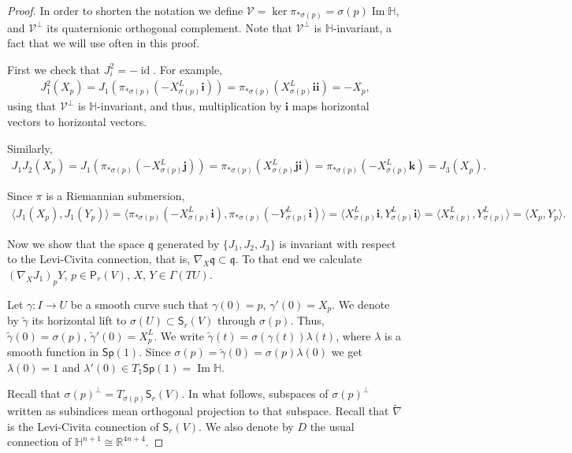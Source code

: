 \documentclass[12pt, a4paper,draft]{amsart}
\newcommand{\id}{\operatorname{id}}
\newcommand{\g}{\mathfrak}
\newcommand{\R}{\mathbb{R}}
\renewcommand{\H}{\mathbb{H}}
\renewcommand{\Im}{\operatorname{Im}}
\newcommand{\Sp}{\mathsf{Sp}}
\theoremstyle{remark}
\begin{document}
\begin{proof}
In order to shorten the notation we define $\mathcal{V}=\ker\pi_{*\sigma(p)}=\sigma(p)\Im\H$, and $\mathcal{V}^\perp$ its quaternionic orthogonal complement.
Note that ${\mathcal{V}}^\perp$ is $\H$-invariant, a fact that we will use often in this proof.

First we check that $J_i^2=-\id$.
For example, 
\[
\begin{aligned}
J_1^2(X_p)
=J_1(\pi_{*\sigma(p)}(-X_{\sigma(p)}^L\mathbf{i}))
=\pi_{*\sigma(p)}(X_{\sigma(p)}^L\mathbf{i}\mathbf{i})
=-X_p,
\end{aligned}
\]
using that $\mathcal{V}^\perp$ is $\H$-invariant, and thus, multiplication by $\mathbf{i}$ maps horizontal vectors to horizontal vectors.

Similarly,
\[
\begin{aligned}
J_1 J_2(X_p)
=J_1(\pi_{*\sigma(p)}(-X_{\sigma(p)}^L\mathbf{j}))
=\pi_{*\sigma(p)}(X_{\sigma(p)}^L\mathbf{j}\mathbf{i})
=\pi_{*\sigma(p)}(-X_{\sigma(p)}^L\mathbf{k})
=J_3(X_p).
\end{aligned}
\]

Since $\pi$ is a Riemannian submersion,
\[
\begin{aligned}
\langle J_1(X_p),J_1(Y_p)\rangle
=\langle \pi_{*\sigma(p)}(-X_{\sigma(p)}^L\mathbf{i}),\pi_{*\sigma(p)}(-Y_{\sigma(p)}^L\mathbf{i})\rangle
=\langle X_{\sigma(p)}^L\mathbf{i}, Y_{\sigma(p)}^L\mathbf{i}\rangle
=\langle X_{\sigma(p)}^L, Y_{\sigma(p)}^L\rangle
=\langle X_p,Y_p\rangle.
\end{aligned}
\]

Now we show that the space $\g{q}$ generated by $\{J_1,J_2,J_3\}$ is invariant with respect to the Levi-Civita connection, that is, $\nabla_X\g{q}\subset\g{q}$.
To that end we calculate $(\nabla_X J_1)_p Y$, $p\in \mathsf{P}_r(V)$, $X$, $Y\in\Gamma(TU)$.

Let $\gamma\colon I\to U$ be a smooth curve such that $\gamma(0)=p$, $\gamma'(0)=X_p$.
We denote by $\tilde{\gamma}$ its horizontal lift to $\sigma(U)\subset\mathsf{S}_r(V)$ through $\sigma(p)$.
Thus, $\tilde{\gamma}(0)=\sigma(p)$, $\tilde{\gamma}'(0)=X_p^L$.
We write $\tilde{\gamma}(t)=\sigma(\gamma(t))\lambda(t)$, where $\lambda$ is a smooth function in $\Sp(1)$.
Since $\sigma(p)=\tilde{\gamma}(0)=\sigma(p)\lambda(0)$ we get $\lambda(0)=1$ and $\lambda'(0)\in T_1\Sp(1)=\Im\H$.

Recall that $\sigma(p)^\perp=T_{\sigma(p)}\mathsf{S}_r(V)$. In what follows, subspaces of $\sigma(p)^\perp$ written as subindices mean orthogonal projection to that subspace.
Recall that $\tilde{\nabla}$ is the Levi-Civita connection of $\mathsf{S}_r(V)$.
We also denote by $D$ the usual connection of $\H^{n+1}\cong\R^{4n+4}$.


\end{proof}
\end{document}
